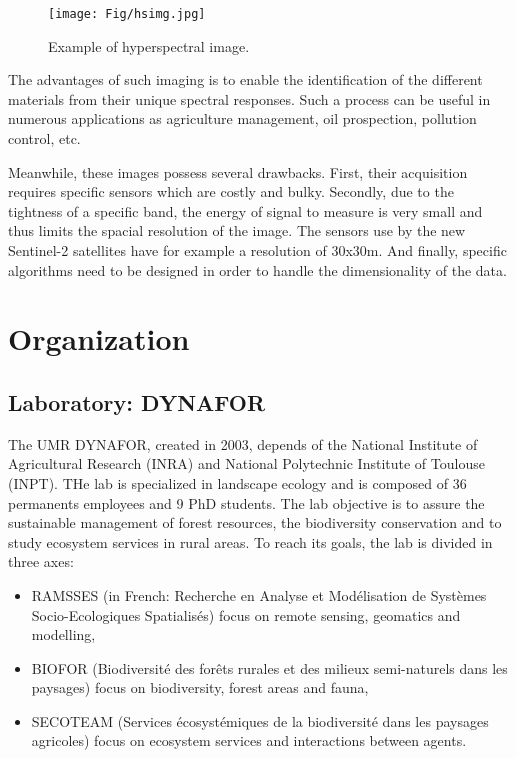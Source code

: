 \documentclass[a4paper,11pt,DIV=16,abstracton]{scrartcl}
\begin{document}
\begin{figure}[!ht]
    \centering
    \texttt{[image: Fig/hsimg.jpg]}
    \caption{Example of hyperspectral image.\label{fig:hs-img}}
\end{figure}

The advantages of such imaging is to enable the identification of the different materials from their unique spectral responses. Such a process can be useful in numerous applications as agriculture management, oil prospection, pollution control, etc.

Meanwhile, these images possess several drawbacks. First, their acquisition requires specific sensors which are costly and bulky. Secondly, due to the tightness of a specific band, the energy of signal to measure is very small and thus limits the spacial resolution of the image. The sensors use by the new Sentinel-2 satellites have for example a resolution of 30x30m. And finally, specific algorithms need to be designed in order to handle the dimensionality of the data.

\section{Organization}
\label{sec:orga}

    \subsection{Laboratory: DYNAFOR}

    The UMR DYNAFOR, created in 2003, depends of the National Institute of Agricultural Research (INRA) and National Polytechnic Institute of Toulouse (INPT). THe lab is specialized in landscape ecology and is composed of 36 permanents employees and 9 PhD students. The lab objective is to assure the sustainable management of forest resources, the biodiversity conservation and to study ecosystem services in rural areas. To reach its goals, the lab is divided in three axes:
    \begin{itemize}
        \item RAMSSES (in French: Recherche en Analyse et Modélisation de Systèmes Socio-Ecologiques Spatialisés) focus on remote sensing, geomatics and modelling,
        \item BIOFOR (Biodiversité des forêts rurales et des milieux semi-naturels dans les paysages) focus on biodiversity, forest areas and fauna,
        \item SECOTEAM (Services écosystémiques de la biodiversité dans les paysages agricoles) focus on ecosystem services and interactions between agents.
    \end{itemize}
\end{document}
